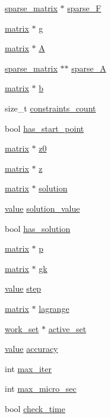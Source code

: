 \begin{DoxyCompactItemize}
\item 
\hyperlink{structsparse__matrix}{sparse\+\_\+matrix} $\ast$ \hyperlink{structproblem_ab7cffa14683d13f6c352ba4bec09a0a3}{sparse\+\_\+\+F}
\item 
\hyperlink{structmatrix}{matrix} $\ast$ \hyperlink{structproblem_ab6856d3e27905889927bce25e9c93d37}{g}
\item 
\hyperlink{structmatrix}{matrix} $\ast$ \hyperlink{structproblem_ac56453eb618f2ce98f20d91442a5690b}{A}
\item 
\hyperlink{structsparse__matrix}{sparse\+\_\+matrix} $\ast$$\ast$ \hyperlink{structproblem_a0a2c5f397434d7a76d6c0a251800c99e}{sparse\+\_\+\+A}
\item 
\hyperlink{structmatrix}{matrix} $\ast$ \hyperlink{structproblem_a844487a6c95b5fd7a6c768f5fdaa24c0}{b}
\item 
size\+\_\+t \hyperlink{structproblem_a012d5476bfafdc0daca39a8f4ae8d2c6}{constraints\+\_\+count}
\item 
bool \hyperlink{structproblem_a2596cd297f65ddbda474ea881a09a9e9}{has\+\_\+start\+\_\+point}
\item 
\hyperlink{structmatrix}{matrix} $\ast$ \hyperlink{structproblem_a2f7d9aba872a4653770df8dd6e3826a1}{z0}
\item 
\hyperlink{structmatrix}{matrix} $\ast$ \hyperlink{structproblem_a840058b5c67561185c94da497d0d3da6}{z}
\item 
\hyperlink{structmatrix}{matrix} $\ast$ \hyperlink{structproblem_a70626c7db657c601438f867391005721}{solution}
\item 
\hyperlink{mat_lib_8h_a9068fffa81949df24c5a7a53ab72bb9b}{value} \hyperlink{structproblem_a6fcb6ec86b1ba65bd2a34e9a9731c452}{solution\+\_\+value}
\item 
bool \hyperlink{structproblem_af593a3f5fcf12e8513374bc6475a53d4}{has\+\_\+solution}
\item 
\hyperlink{structmatrix}{matrix} $\ast$ \hyperlink{structproblem_a0b8e7c785036ef0cb64a801257094918}{p}
\item 
\hyperlink{structmatrix}{matrix} $\ast$ \hyperlink{structproblem_abfbecabeb3ffaa60557898d366c79c35}{gk}
\item 
\hyperlink{mat_lib_8h_a9068fffa81949df24c5a7a53ab72bb9b}{value} \hyperlink{structproblem_a9c398bc1d126ef3a4cf1efdc9d9f7423}{step}
\item 
\hyperlink{structmatrix}{matrix} $\ast$ \hyperlink{structproblem_a988084bf1423637718de8882244149f4}{lagrange}
\item 
\hyperlink{structwork__set}{work\+\_\+set} $\ast$ \hyperlink{structproblem_a27b8b36dc36cb3620e52c6275d0bb87b}{active\+\_\+set}
\item 
\hyperlink{mat_lib_8h_a9068fffa81949df24c5a7a53ab72bb9b}{value} \hyperlink{structproblem_abb02aa4aa436e037d8c806b2364cf97c}{accuracy}
\item 
int \hyperlink{structproblem_a53380b3b14c20bdfcb3bc9970c421231}{max\+\_\+iter}
\item 
int \hyperlink{structproblem_af471c126183533a7a418a166768af42d}{max\+\_\+micro\+\_\+sec}
\item 
bool \hyperlink{structproblem_afb90fd1d52b36f4f03af3b09f7679bd8}{check\+\_\+time}
\end{DoxyCompactItemize}
